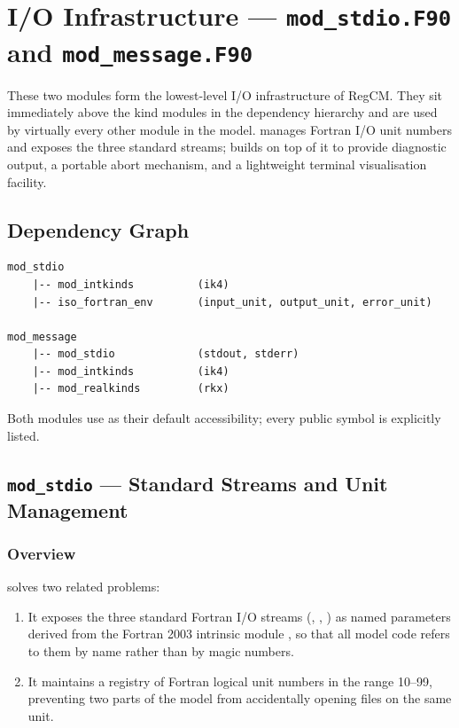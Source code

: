 \section{I/O Infrastructure --- \texttt{mod\_stdio.F90} and
         \texttt{mod\_message.F90}}
\label{sec:stdio_message}

These two modules form the lowest-level I/O infrastructure of RegCM. They sit
immediately above the kind modules in the dependency hierarchy and are used by
virtually every other module in the model.  manages Fortran
I/O unit numbers and exposes the three standard streams; 
builds on top of it to provide diagnostic output, a portable abort mechanism,
and a lightweight terminal visualisation facility.

\subsection{Dependency Graph}

\begin{lstlisting}
mod_stdio
    |-- mod_intkinds          (ik4)
    |-- iso_fortran_env       (input_unit, output_unit, error_unit)

mod_message
    |-- mod_stdio             (stdout, stderr)
    |-- mod_intkinds          (ik4)
    |-- mod_realkinds         (rkx)
\end{lstlisting}

Both modules use  as their default accessibility; every public
symbol is explicitly listed.

\subsection{\texttt{mod\_stdio} --- Standard Streams and Unit Management}
\label{subsec:stdio}

\subsubsection{Overview}

 solves two related problems:

\begin{enumerate}
  \item It exposes the three standard Fortran I/O streams (,
        , ) as named  parameters
        derived from the Fortran 2003 intrinsic module ,
        so that all model code refers to them by name rather than by magic
        numbers.
  \item It maintains a registry of Fortran logical unit numbers in the range
        10--99, preventing two parts of the model from accidentally opening
        files on the same unit.
\end{enumerate}


